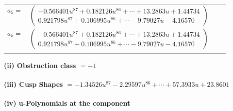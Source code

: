 \documentclass[1p]{elsarticle_modified}
\theoremstyle{definition}
\begin{document}
\begin{tabular}{m{7pt} m{180pt} m{7pt} m{180pt} }
\flushright $a_{5}=$&$\begin{pmatrix}-0.566401 u^{87}+0.182126 u^{86}+\cdots+13.2863 u+1.44734\\0.921798 u^{87}+0.106995 u^{86}+\cdots-9.79027 u-4.16570\end{pmatrix}$\\ \flushright $a_{5}=$&$\begin{pmatrix}-0.566401 u^{87}+0.182126 u^{86}+\cdots+13.2863 u+1.44734\\0.921798 u^{87}+0.106995 u^{86}+\cdots-9.79027 u-4.16570\end{pmatrix}$\\&\end{tabular}
\flushleft \textbf{(ii) Obstruction class $= -1$}\\~\\
\flushleft \textbf{(iii) Cusp Shapes $= -1.34526 u^{87}-2.29597 u^{86}+\cdots+57.3933 u+23.8601$}\\~\\
\newpage\renewcommand{\arraystretch}{1}
\flushleft \textbf{(iv) u-Polynomials at the component}\newline \\
\end{document}
